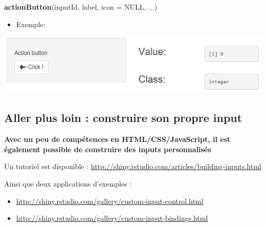 \documentclass[
]{article}
\newenvironment{Shaded}{\begin{snugshade}}{\end{snugshade}}
\newcommand{\AttributeTok}[1]{\textcolor[rgb]{0.13,0.29,0.53}{#1}}
\newcommand{\CommentTok}[1]{\textcolor[rgb]{0.56,0.35,0.01}{\textit{#1}}}
\newcommand{\ConstantTok}[1]{\textcolor[rgb]{0.56,0.35,0.01}{#1}}
\newcommand{\FunctionTok}[1]{\textcolor[rgb]{0.13,0.29,0.53}{\textbf{#1}}}
\newcommand{\NormalTok}[1]{#1}
\newcommand{\StringTok}[1]{\textcolor[rgb]{0.31,0.60,0.02}{#1}}
\providecommand{\tightlist}{%
  \setlength{\itemsep}{0pt}\setlength{\parskip}{0pt}}
\begin{document}
\begin{Shaded}
\begin{Highlighting}[]
\FunctionTok{actionButton}\NormalTok{(inputId, label, }\AttributeTok{icon =} \ConstantTok{NULL}\NormalTok{, ...)}
\end{Highlighting}
\end{Shaded}

\begin{itemize}
\tightlist
\item
  Exemple:
\end{itemize}

\begin{Shaded}
\end{Shaded}

\includegraphics{img/action.png}

\hypertarget{aller-plus-loin-construire-son-propre-input}{%
\subsection{Aller plus loin : construire son propre
input}\label{aller-plus-loin-construire-son-propre-input}}

\textbf{Avec un peu de compétences en HTML/CSS/JavaScript, il est
également possible de construire des inputs personnalisés}

Un tutoriel est disponible :
\url{http://shiny.rstudio.com/articles/building-inputs.html}

Ainsi que deux applications d'exemples :

\begin{itemize}
\item
  \url{http://shiny.rstudio.com/gallery/custom-input-control.html}
\item
  \url{http://shiny.rstudio.com/gallery/custom-input-bindings.html}
\end{itemize}
\end{document}
